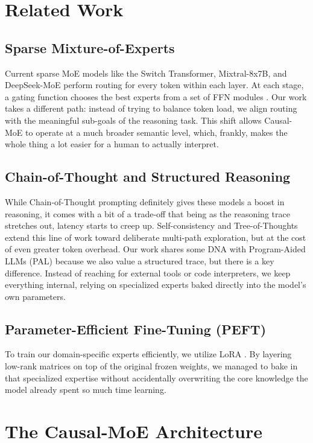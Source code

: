 \documentclass[conference,compsoc]{IEEEtran}
\begin{document}
\section{Related Work}
\subsection{Sparse Mixture-of-Experts}
Current sparse MoE models like the Switch Transformer, Mixtral-8x7B, and DeepSeek-MoE perform routing for every token within each layer. At each stage, a gating function chooses the best experts from a set of FFN modules \cite{b1,b3,b8,b10}. Our work takes a different path: instead of trying to balance token load, we align routing with the meaningful sub-goals of the reasoning task. This shift allows Causal-MoE to operate at a much broader semantic level, which, frankly, makes the whole thing a lot easier for a human to actually interpret.

\subsection{Chain-of-Thought and Structured Reasoning}
While Chain-of-Thought prompting \cite{b4} definitely gives these models a boost in reasoning, it comes with a bit of a trade-off that being as the reasoning trace stretches out, latency starts to creep up. Self-consistency \cite{b17} and Tree-of-Thoughts \cite{b18} extend this line of work toward deliberate multi-path exploration, but at the cost of even greater token overhead. Our work shares some DNA with Program-Aided LLMs (PAL) \cite{b5} because we also value a structured trace, but there is a key difference. Instead of reaching for external tools or code interpreters, we keep everything internal, relying on specialized experts baked directly into the model's own parameters.

\subsection{Parameter-Efficient Fine-Tuning (PEFT)}
To train our domain-specific experts efficiently, we utilize LoRA \cite{b2}. By layering low-rank matrices on top of the original frozen weights, we managed to bake in that specialized expertise without accidentally overwriting the core knowledge the model already spent so much time learning.

\section{The Causal-MoE Architecture}
\end{document}
